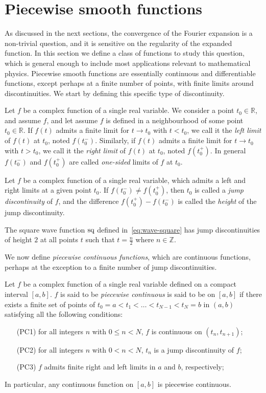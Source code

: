 \section{Piecewise smooth functions}
As discussed in the next sections, the convergence of the Fourier expansion is a
non-trivial question, and it is sensitive on the regularity of the expanded function. In
this section we define a class of functions to study this question, which is general
enough to include most applications relevant to mathematical physics. Piecewise smooth
functions are essentially continuous and differentiable functions, except perhaps at a
finite number of points, with finite limits around discontinuities. We start by defining
this specific type of discontinuity.
\begin{definition}
  Let $f$ be a complex function of a single real variable. We consider a point $t_0\in\mathbb{R}$,
  and assume $f$, and let assume $f$ is defined in a neighbourhood of some point
  $t_0\in\mathbb{R}$. If $f(t)$ admits a finite limit for $t\to t_0$ with $t<t_0$, we call
  it the \emph{left limit} of $f(t)$ at $t_0$, noted $f(t_0^-)$. Similarly, if $f(t)$
  admits a finite limit for $t\to t_0$ with $t>t_0$, we call it the \emph{right limit} of
  $f(t)$ at $t_0$, noted $f(t_0^+)$. In general $f(t_0^-)$ and $f(t_0^+)$ are called
  \emph{one-sided} limits of $f$ at $t_0$.
\end{definition}
\begin{definition}
  Let $f$ be a complex function of a single real variable, which admits a left and right limits at
  a given point $t_0$. If $f(t_0^-)\neq f(t_0^+)$, then $t_0$ is called a \emph{jump
  discontinuity} of $f$, and the difference $f(t_0^+)-f(t_0^-)$ is called the
  \emph{height} of the jump discontinuity.
\end{definition}
\begin{example}
  The square wave function $\operatorname{sq}$ defined in~\cref{eq:wave-square} has jump discontinuities
  of height $2$ at all points $t$ such that $t=\frac{n}{2}$ where $n\in\mathbb{Z}$.
\end{example}
We now define \emph{piecewise continuous functions}, which are continuous functions,
perhaps at the exception to a finite number of jump discontinuities.
\begin{definition}
  \label{def:pw-cont}
  Let $f$ be a complex function of a single real variable defined on a compact interval $[a,b]$.
  $f$ is said to be \emph{piecewise continuous} is said to be on $[a,b]$ if there exists a
  finite set of points of $t_0=a<t_1<\dots<t_{N-1}<t_N=b$ in $(a,b)$ satisfying all the
  following conditions:
  \begin{itemize}
    \item[(PC1)] for all integers $n$ with $0\leq n< N$, $f$ is continuous on
      $(t_n,t_{n+1})$;
    \item[(PC2)] for all integers $n$ with $0< n< N$, $t_n$ is a jump discontinuity of
      $f$;
    \item[(PC3)] $f$ admits finite right and left limits in $a$ and $b$, respectively;
  \end{itemize}
  In particular, any continuous function on $[a,b]$ is piecewise continuous.
\end{definition}
